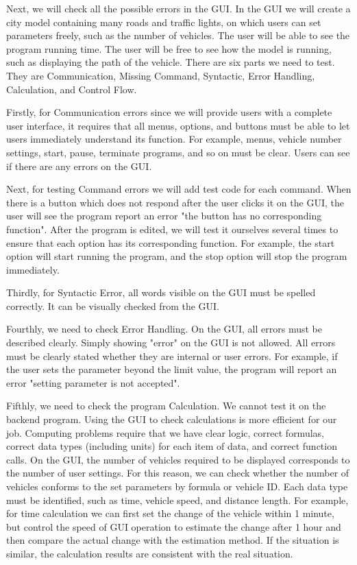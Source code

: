 \documentclass[onecolumn, draftclsnofoot,10pt, compsoc]{IEEEtran}
\begin{document}
Next, we will check all the possible errors in the GUI.
In the GUI we will create a city model containing many roads and traffic lights, on which users can set parameters freely, such as the number of vehicles.
The user will be able to see the program running time.
The user will be free to see how the model is running, such as displaying the path of the vehicle.
There are six parts we need to test.
They are Communication, Missing Command, Syntactic, Error Handling, Calculation, and Control Flow.

Firstly, for Communication errors since we will provide users with a complete user interface, it requires that all menus, options, and buttons must be able to let users immediately understand its function.
For example, menus, vehicle number settings, start, pause, terminate programs, and so on must be clear.
Users can see if there are any errors on the GUI. 

Next, for testing Command errors we will add test code for each command.
When there is a button which does not respond after the user clicks it on the GUI, the user will see the program report an error "the button has no corresponding function".
After the program is edited, we will test it ourselves several times to ensure that each option has its corresponding function.
For example, the start option will start running the program, and the stop option will stop the program immediately. 

Thirdly, for Syntactic Error, all words visible on the GUI must be spelled correctly.
It can be visually checked from the GUI. 

Fourthly, we need to check Error Handling.
On the GUI, all errors must be described clearly.
Simply showing "error" on the GUI is not allowed.
All errors must be clearly stated whether they are internal or user errors.
For example, if the user sets the parameter beyond the limit value, the program will report an error "setting parameter is not accepted". 

Fifthly, we need to check the program Calculation.
We cannot test it on the backend program.
Using the GUI to check calculations is more efficient for our job.
Computing problems require that we have clear logic, correct formulas, correct data types (including units) for each item of data, and correct function calls.
On the GUI, the number of vehicles required to be displayed corresponds to the number of user settings.
For this reason, we can check whether the number of vehicles conforms to the set parameters by formula or vehicle ID.
Each data type must be identified, such as time, vehicle speed, and distance length.
For example, for time calculation we can first set the change of the vehicle within 1 minute, but control the speed of GUI operation to estimate the change after 1 hour and then compare the actual change with the estimation method.
If the situation is similar, the calculation results are consistent with the real situation. 
\end{document}
